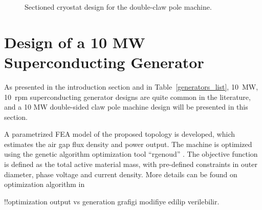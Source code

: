 \documentclass[12pt]{iopart}
\begin{document}
\begin{figure}[]
    \caption{Sectioned cryostat design for the double-claw pole machine.} 
    \label{cryostat_variants}
\end{figure}

\section{Design of a 10 MW Superconducting Generator}
 
As presented in the introduction section and in Table~\ref{generators_list}, 10~MW, 10~rpm superconducting generator designs are quite common in the literature, and a 10 MW double-sided claw pole machine design will be presented in this section.

A parametrized FEA model of the proposed topology is developed, which estimates the air gap flux density and power output. The machine is optimized using the genetic algorithm optimization tool ``rgenoud'' \cite{Mebane2011}. 
The objective function is defined as the total active material mass, with pre-defined constraints in outer diameter, phase voltage and current density.
More details can be found on optimization algorithm in \cite{github-repo}

!!optimization output vs generation grafigi modifiye edilip verilebilir.
\end{document}

